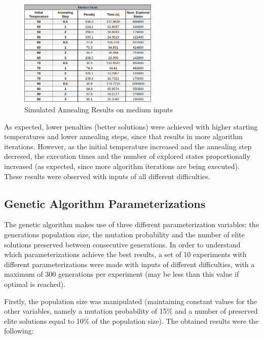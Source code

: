 \documentclass[conference]{IEEEtran}
\begin{document}
\begin{figure}[H]
    \centerline{\includegraphics[width=250px]{annealing_medium.png}}
    \caption{Simulated Annealing Results on medium inputs}
\end{figure}

As expected, lower penalties (better solutions) were achieved with higher starting temperatures and lower annealing steps, since that results in more algorithm iterations. However, as the initial temperature increased and the annealing step decresed, the execution times and the number of explored states proportionally increased (as expected, since more algorithm iterations are being executed). These results were observed with inputs of all different difficulties.

\subsection{Genetic Algorithm Parameterizations}

The genetic algorithm makes use of three different parameterization variables: the generations population size, the mutation probability and the number of elite solutions preserved between consecutive generations. In order to understand which parameterizations achieve the best results, a set of 10 experiments with different parameterizations were made with inputs of different difficulties, with a maximum of 300 generations per experiment (may be less than this value if optimal is reached).

Firstly, the population size was manipulated (maintaining constant values for the other variables, namely a mutation probability of 15\% and a number of preserved elite solutions equal to 10\% of the population size). The obtained results were the following: 
\end{document}
